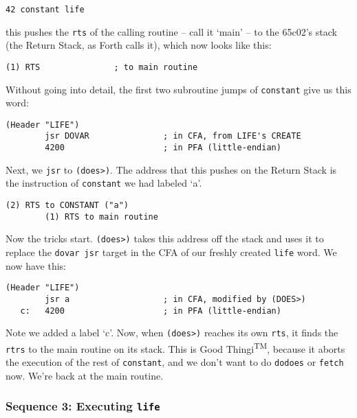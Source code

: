 \begin{lstlisting}[frame=lines]
        42 constant life
\end{lstlisting}

\noindent this pushes the \texttt{rts} of the calling routine -- call it `main'
-- to the 65c02's stack (the Return Stack, as Forth calls it), which now looks
like this:

\begin{lstlisting}[frame=lines]
        (1) RTS               ; to main routine 
\end{lstlisting}

\noindent Without going into detail, the first two subroutine jumps of \texttt{constant} give us
this word: 

\begin{lstlisting}[frame=lines]
        (Header "LIFE")
        jsr DOVAR               ; in CFA, from LIFE's CREATE
        4200                    ; in PFA (little-endian)
\end{lstlisting}

\noindent Next, we \texttt{jsr} to \texttt{(does>)}. The address that this
pushes on the Return Stack is the instruction of \texttt{constant} we had
labeled `a'. 

\begin{lstlisting}[frame=lines]
        (2) RTS to CONSTANT ("a") 
        (1) RTS to main routine 
\end{lstlisting}

\noindent Now the tricks start. \texttt{(does>)} takes this address off the stack and uses
it to replace the \texttt{dovar jsr} target in the CFA of our freshly created
\texttt{life} word. We now have this: 

\begin{lstlisting}[frame=lines]
        (Header "LIFE")
        jsr a                   ; in CFA, modified by (DOES>)
   c:   4200                    ; in PFA (little-endian)
\end{lstlisting}

\noindent Note we added a label `c'. Now, when \texttt{(does>)} reaches its own
\texttt{rts}, it finds the \texttt{rtrs} to the main routine on its stack. This
is Good Thingi\textsuperscript{TM}, because it aborts the execution of the rest
of \texttt{constant}, and we don't want to do \texttt{dodoes} or \texttt{fetch}
now.  We're back at the main routine. 


\subsubsection{Sequence 3: Executing \texttt{life}}

